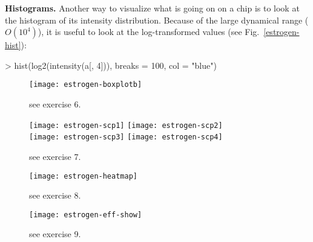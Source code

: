 \documentclass[a4paper]{article}
\begin{document}
\begin{exercises}
%

\item {\bf Histograms.}  
Another way to visualize what is going on on a chip is to 
look at the histogram of its intensity distribution.  
Because of the large dynamical range ($O(10^4)$), it is 
useful to look at the log-transformed values
(see Fig.~\ref{estrogen-hist}):
%
\begin{Schunk}
\begin{Sinput}
> hist(log2(intensity(a[, 4])), breaks = 100, col = "blue")
\end{Sinput}
\end{Schunk}
%
\begin{figure}[h]
\begin{center}	
  \texttt{[image: estrogen-boxplotb]}
  \caption{\label{estrogen-boxplot} see exercise 6.}
 \end{center}
\end{figure}

\begin{figure}[h]
\begin{center}	
  \texttt{[image: estrogen-scp1]}
  \texttt{[image: estrogen-scp2]} \\
  \texttt{[image: estrogen-scp3]}
  \texttt{[image: estrogen-scp4]}
  \caption{\label{estrogen-scp} see exercise 7.}
 \end{center}
\end{figure}

\begin{figure}[h]
\begin{center}	
  \texttt{[image: estrogen-heatmap]}
  \caption{\label{estrogen-heatmap} see exercise 8.}
 \end{center}
\end{figure}

\begin{figure}[h]
\begin{center}	
  \texttt{[image: estrogen-eff-show]}
  \caption{\label{estrogen-eff} see exercise 9.}
 \end{center}
\end{figure}


\end{exercises}
\end{document}
